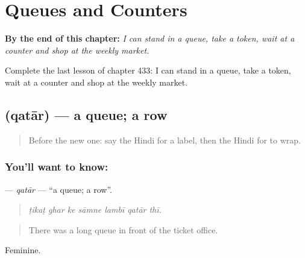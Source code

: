 
\chapter{Queues and Counters}
\label{ch:hi-queues-and-counters}

\begin{chapteropening}
\textbf{By the end of this chapter:} \emph{I can stand in a queue, take a token, wait at a counter and shop at the weekly market.}

Complete the last lesson of chapter 433: I can stand in a queue, take a token, wait at a counter and shop at the weekly market.
\end{chapteropening}

\section[\texorpdfstring{\hi{क़तार} (qatār)}{क़तार (qatār)}]{ (qatār) — a queue; a row}

\label{lesson:HI-C433-qatar}



\begin{quote}
Before the new one: say the Hindi for a label, then the Hindi for to wrap.
\end{quote}

\subsection*{You'll want to know: }
\textbf{} — \emph{qatār} — \textquotedblleft{}a queue; a row\textquotedblright{}.

\begin{quote}
      
\end{quote}

\begin{quote}
\emph{ṭikaṭ ghar ke sāmne lambī qatār thī.}
\end{quote}

\begin{quote}
There was a long queue in front of the ticket office.
\end{quote}

Feminine.

